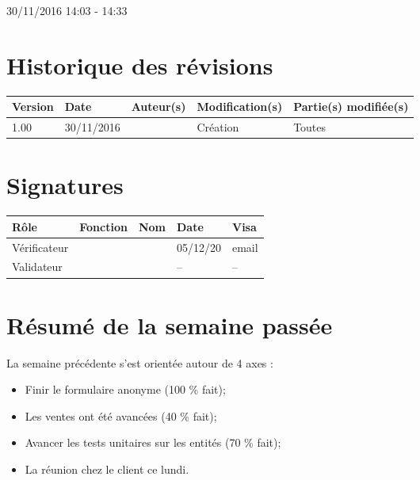 \documentclass [a4paper] {article}
\begin{document}
30/11/2016			 				%
\hfill   
\hfill 	 14:03 - 14:33				%


\section*{Historique des révisions}
\begin{center}
			\begin{tabular}{| p{2.5cm} | p{3cm} | p{3cm} | p{3cm} | p{3.5cm} |}
				\hline
				\rowcolor{Gray}
				Version & Date & Auteur(s) & Modification(s) & Partie(s) modifiée(s)		 \\
				\hline
				1.00 & 30/11/2016 & \Kafui & Création & Toutes \\
				\hline			
			\end{tabular}
		\end{center}

\section*{Signatures}

		\begin{center}
			\begin{tabular}{| p{2.5cm} | p{4cm} | p{3cm} | p{3cm} | p{2.5cm} |}
				\hline
				\rowcolor{Gray}
				Rôle & Fonction & Nom & Date & Visa		 \\
				\hline
				Vérificateur & \RGC & \Melissa & 05/12/20 & email \\[30pt]
				\hline
				Validateur & \CP & \Pierre &  -- & -- \\[30pt]	
				\hline
			\end{tabular}
		\end{center}

\section{Résumé de la semaine passée}
La semaine précédente s'est orientée autour de 4 axes :  
\begin{itemize}
	\item Finir le formulaire anonyme (100 \% fait);
	\item Les ventes ont été avancées (40 \% fait);
	\item Avancer les tests unitaires sur les entités (70 \% fait);
	\item La réunion chez le client ce lundi.
\end{itemize} 
\end{document}

